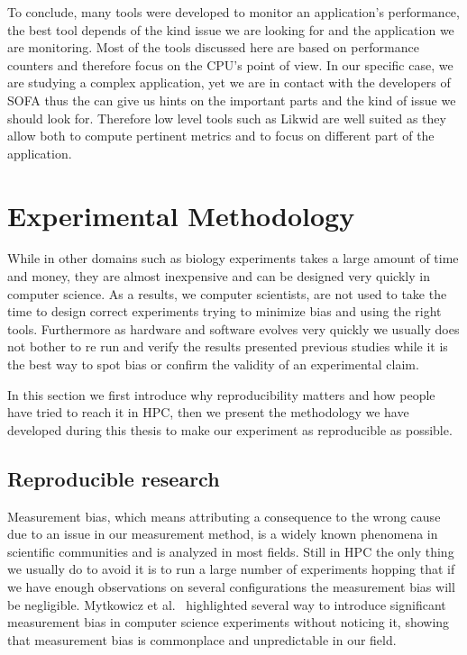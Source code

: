 To conclude, many tools were developed to monitor an application's performance, the best tool depends of the kind issue we are looking for and the application we are monitoring.
Most of the tools discussed here are based on performance counters and therefore focus on the \gls{CPU}'s point of view.
In our specific case, we are studying a complex application, yet we are in contact with the developers of \gls{SOFA} thus the can give us hints on the important parts and the kind of issue we should look for.
Therefore low level tools such as \gls{Likwid} are well suited as they allow both to compute pertinent metrics and to focus on different part of the application.

\section{Experimental Methodology}
\label{sec:expe-methodo}

While in other domains such as biology experiments takes a large amount of time and money, they are almost inexpensive and can be designed very quickly in computer science.
As a results, we computer scientists, are not used to take the time to design correct experiments trying to minimize bias and using the right tools.
Furthermore as hardware and software evolves very quickly we usually does not bother to re run and verify the results presented previous studies while it is the best way to spot bias or confirm the validity of an experimental claim.

In this section we first introduce why reproducibility matters and how people have tried to reach it in \gls{HPC}, then we present the methodology we have developed during this thesis to make our experiment as reproducible as possible.


\subsection{Reproducible research}

Measurement bias, which means attributing a consequence to the wrong cause due to an issue in our measurement method, is a widely known phenomena in scientific communities and is analyzed in most fields.
Still in \gls{HPC} the only thing we usually do to avoid it is to run a large number of experiments hopping that if we have enough observations on several configurations the measurement bias will be negligible.
Mytkowicz et al.~\cite{Mytkowicz09Producing} highlighted several way to introduce significant measurement bias in computer science experiments without noticing it, showing that measurement bias is commonplace and unpredictable in our field.


